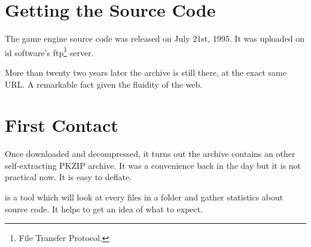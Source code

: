 \documentclass[book.tex]{subfiles}
\begin{document}
\section{Getting the Source Code}
The game engine source code was released on July 21st, 1995. It was uploaded on id software's ftp\footnote{File Transfer Protocol.} server.\\ 
\par
\begin{minipage}{\textwidth}

\end{minipage}
\par
More than twenty two years later the archive is still there, at the exact same URL. A remarkable fact given the fluidity of the web.\\

\section{First Contact}
Once downloaded and decompressed, it turns out the archive  contains an other self-extracting PKZIP archive. It was a convenience back in the day but it is not practical now. It is easy to deflate.\\
\par
\begin{minipage}{\textwidth}

\end{minipage}

\par
{} is a tool which will look at every files in a folder and gather statistics about source code. It helps to get an idea of what to expect.\\
\par

\begin{minipage}{\textwidth}

\end{minipage}
\end{document}
